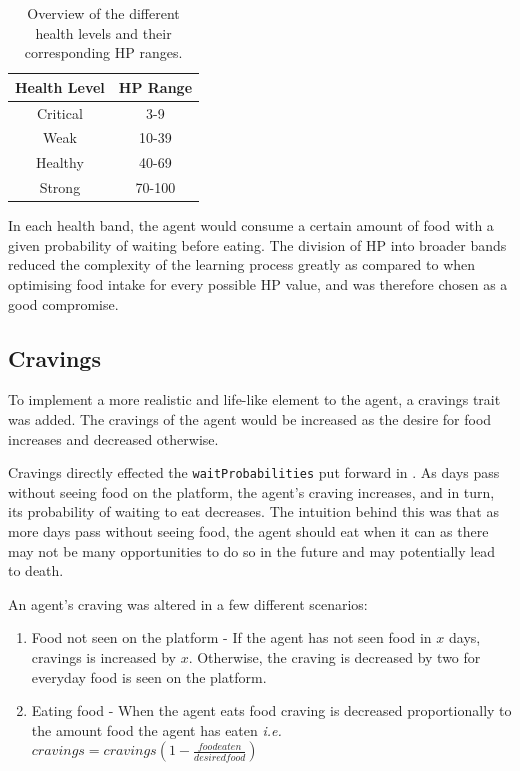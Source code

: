 \begin{table}[htb]
    \centering
    \begin{tabular}{| c | c |}
    \hline
    Health Level & HP Range \\
    \hline
    \hline
     Critical & 3-9 \\ 
    \hline
     Weak &  10-39\\  
     \hline
     Healthy &  40-69\\
     \hline
     Strong & 70-100 \\
     \hline
    \end{tabular}
    \caption{Overview of the different health levels and their corresponding HP ranges.}
    \label{tab:healthLevels}
\end{table}

In each health band, the agent would consume a certain amount of food with a given probability of waiting before eating. The division of HP into broader bands reduced the complexity of the learning process greatly as compared to when optimising food intake for every possible HP value, and was therefore chosen as a good compromise.

\subsection{Cravings}

To implement a more realistic and life-like element to the agent, a cravings trait was added. The cravings of the agent would be increased as the desire for food increases and decreased otherwise.

Cravings directly effected the \texttt{waitProbabilities} put forward in . As days pass without seeing food on the platform, the agent's craving increases, and in turn, its probability of waiting to eat decreases. The intuition behind this was that as more days pass without seeing food, the agent should eat when it can as there may not be many opportunities to do so in the future and may potentially lead to death.\newline

An agent's craving was altered in a few different scenarios:
\begin{enumerate}
    \item Food not seen on the platform - If the agent has not seen food in $x$ days, cravings is increased by $x$. Otherwise, the craving is decreased by two for everyday food is seen on the platform. 
    \item Eating food - When the agent eats food craving is decreased proportionally to the amount food the agent has eaten \emph{i.e.} $cravings = cravings \left(1 - \frac{foodeaten}{desiredfood}\right)$
\end{enumerate}

